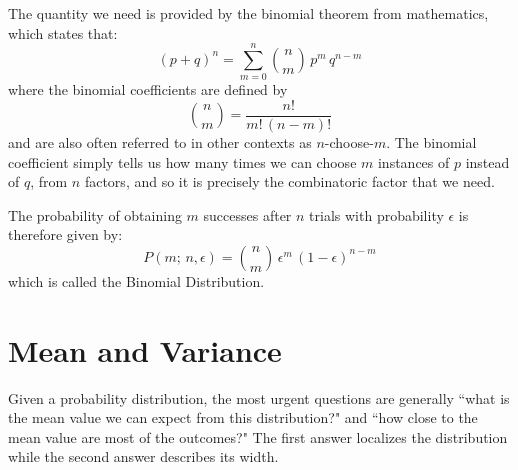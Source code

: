\documentclass[12pt,oneside]{book}
\begin{document}
The quantity we need is provided by the binomial theorem from mathematics, which states that:
\begin{equation}
\label{eqn:binomt}
(p+q)^n = \sum_{m=0}^{n} \binom{n}{m} \, p^m \, q^{n-m}
\end{equation}
where the binomial coefficients are defined by
\begin{equation}
\label{eqn:binomc}
\binom{n}{m} = \frac{n!}{m! \, (n-m)!}
\end{equation}
and are also often referred to in other contexts as $n$-choose-$m$.  The binomial coefficient simply tells us how many times we can choose $m$ instances of $p$ instead of $q$, from $n$ factors, and so it is precisely the combinatoric factor that we need.

The probability of obtaining $m$ successes after $n$ trials with probability $\epsilon$ is therefore given by:
\begin{equation}
\label{eqn:binom}
P(m; \, n ,\epsilon) = \binom{n}{m} \, \epsilon^m \, (1 - \epsilon)^{n-m}
\end{equation}
which is called the Binomial Distribution.

\section{Mean and Variance}

Given a probability distribution, the most urgent questions are generally ``what is the mean value we can expect from this distribution?" and ``how close to the mean value are most of the outcomes?"  The first answer localizes the distribution while the second answer describes its width.
\end{document}
